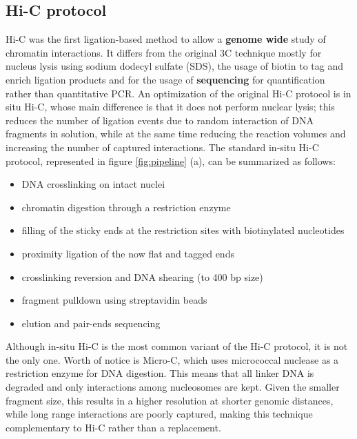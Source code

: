 \subsection{Hi-C protocol}
Hi-C was the first ligation-based method to allow a \textbf{genome wide} study of chromatin interactions. It differs from the original 3C technique mostly for nucleus lysis using sodium dodecyl sulfate (SDS), the usage of biotin to tag and enrich ligation products and for the usage of \textbf{sequencing} for quantification rather than quantitative PCR\cite{hicoriginal2009}. An optimization of the original Hi-C protocol is in situ Hi-C, whose main difference is that it does not perform nuclear lysis; this reduces the number of ligation events due to random interaction of DNA fragments in solution, while at the same time reducing the reaction volumes and increasing the number of captured interactions\cite{insituhic2014}. The standard in-situ Hi-C protocol, represented in figure \ref{fig:pipeline} (a), can be summarized as follows:

\begin{itemize}\tightlist
  \item DNA crosslinking on intact nuclei
  \item chromatin digestion through a restriction enzyme
  \item filling of the sticky ends at the restriction sites with biotinylated nucleotides
  \item proximity ligation of the now flat and tagged ends
  \item crosslinking reversion and DNA shearing (to 400 bp size)
  \item fragment pulldown using streptavidin beads
  \item elution and pair-ends sequencing
\end{itemize}
 
Although in-situ Hi-C is the most common variant of the Hi-C protocol, it is not the only one. Worth of notice is Micro-C, which uses micrococcal nuclease as a restriction enzyme for DNA digestion. This means that all linker DNA is degraded and only interactions among nucleosomes are kept. Given the smaller fragment size, this results in a higher resolution at shorter genomic distances, while long range interactions are poorly captured, making this technique complementary to Hi-C rather than a replacement\cite{microc2015}.

